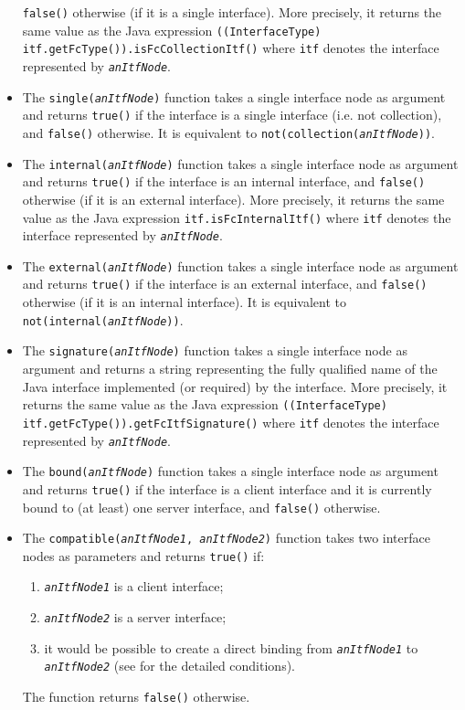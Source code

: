 \documentclass[a4paper,12pt]{report}
\begin{document}
\begin{itemize}
  \texttt{false()} otherwise (if it is a single interface). More precisely, it returns the
  same value as the Java expression \texttt{((InterfaceType)
    itf.get\-Fc\-Type()).is\-Fc\-Collection\-Itf()} where \texttt{itf} denotes the interface
  represented by \texttt{\textsl{an\-Itf\-Node}}.
\item The \texttt{single(\textsl{anItfNode})} function takes a single interface node as
  argument and returns \texttt{true()} if the interface is a single interface (i.e. not
  collection), and \texttt{false()} otherwise. It is equivalent to
  \texttt{not(collection(\textsl{anItfNode}))}.
\item The \texttt{internal(\textsl{anItfNode})} function takes a single interface node as
  argument and returns \texttt{true()} if the interface is an internal interface, and
  \texttt{false()} otherwise (if it is an external interface). More precisely, it returns
  the same value as the Java expression \texttt{itf.isFcInternalItf()} where \texttt{itf}
  denotes the interface represented by \texttt{\textsl{anItfNode}}.
\item The \texttt{external(\textsl{anItfNode})} function takes a single interface node as
  argument and returns \texttt{true()} if the interface is an external interface, and
  \texttt{false()} otherwise (if it is an internal interface). It is equivalent to
  \texttt{not(internal(\textsl{an\-Itf\-Node}))}.
\item The \texttt{signature(\textsl{anItfNode})} function takes a single interface node
  as argument and returns a string representing the fully qualified name of the Java
  interface implemented (or required) by the interface. More precisely, it returns the
  same value as the Java expression \texttt{((InterfaceType)
    itf.get\-Fc\-Type()).get\-Fc\-Itf\-Signature()} where \texttt{itf} denotes the interface
  represented by \texttt{\textsl{anItfNode}}.
\item The \texttt{bound(\textsl{anItfNode})} function takes a single interface node as
  argument and returns \texttt{true()} if the interface is a client interface and it is
  currently bound to (at least) one server interface, and \texttt{false()} otherwise.
\item The \texttt{compatible(\textsl{anItfNode1}, \textsl{anItfNode2})} function takes two
  interface nodes as parameters and returns \texttt{true()} if:
  \begin{enumerate}
  \item \texttt{\textsl{anItfNode1}} is a client interface;
  \item \texttt{\textsl{anItfNode2}} is a server interface;
  \item it would be possible to create a direct binding from \texttt{\textsl{anItfNode1}}
    to \texttt{\textsl{anItfNode2}} (see \citep{bruneton-coupaye-stefani.ow2003} for the
    detailed conditions).
  \end{enumerate}
  The function returns \texttt{false()} otherwise.
\end{itemize}
\end{document}
